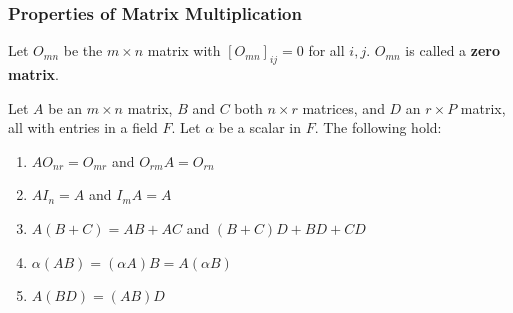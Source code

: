 \documentclass{article}
\begin{document}
\subsubsection{Properties of Matrix Multiplication}
\begin{definition}
  Let $O_{mn}$ be the $m \times n$ matrix with $[O_{mn}]_{ij} = 0$ for all $i, j$. $O_{mn}$ is called a \textbf{zero matrix}.
\end{definition}
\begin{theorem}
  Let $A$ be an $m \times n$ matrix, $B$ and $C$ both $n \times r$ matrices, and $D$ an $r \times P$ matrix, all with entries in a field $F$. Let $\alpha$ be a scalar in $F$. The following hold:
  \begin{enumerate}
    \item $AO_{nr} = O_{mr}$ and $O_{rm}A = O_{rn}$
    \item $AI_n = A$ and $I_mA = A$
    \item $A(B+C) = AB + AC$ and $(B+C)D + BD + CD$
    \item $\alpha(AB) = (\alpha A)B = A(\alpha B)$
    \item $A(BD) = (AB)D$
  \end{enumerate}

\end{theorem}
\end{document}
